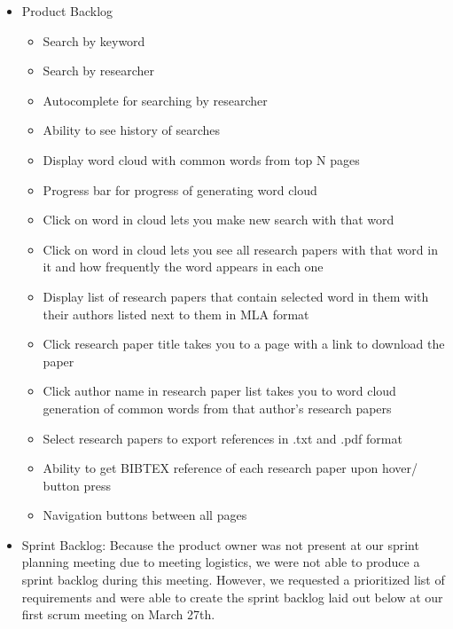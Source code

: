 \documentclass[]{article}
\begin{document}
\begin{itemize}
\item
  Product Backlog

  \begin{itemize}
  \itemsep1pt\parskip0pt
  \item
    Search by keyword
  \item
    Search by researcher
  \item
    Autocomplete for searching by researcher
  \item
    Ability to see history of searches
  \item
    Display word cloud with common words from top N pages
  \item
    Progress bar for progress of generating word cloud
  \item
    Click on word in cloud lets you make new search with that word
  \item
    Click on word in cloud lets you see all research papers with that
    word in it and how frequently the word appears in each one
  \item
    Display list of research papers that contain selected word in them
    with their authors listed next to them in MLA format
  \item
    Click research paper title takes you to a page with a link to
    download the paper
  \item
    Click author name in research paper list takes you to word cloud
    generation of common words from that author's research papers
  \item
    Select research papers to export references in .txt and .pdf format
  \item
    Ability to get BIBTEX reference of each research paper upon hover/
    button press
  \item
    Navigation buttons between all pages
  \end{itemize}
\item
  Sprint Backlog: Because the product owner was not present at our
  sprint planning meeting due to meeting logistics, we were not able to
  produce a sprint backlog during this meeting. However, we requested a
  prioritized list of requirements and were able to create the sprint
  backlog laid out below at our first scrum meeting on March 27th.


\end{itemize}
\end{document}
